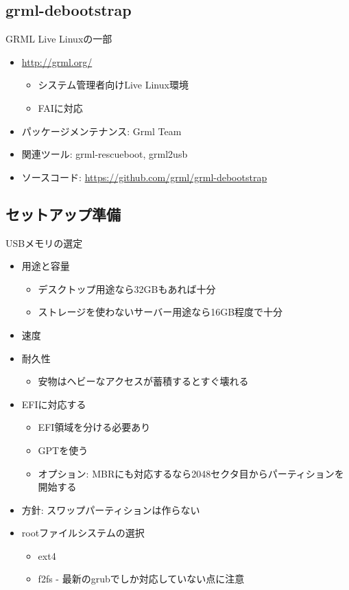 \documentclass[mingoth,a4paper]{jsarticle}
\begin{document}
\subsection{grml-debootstrap}


GRML Live Linuxの一部
\begin{itemize}
  \item \url{http://grml.org/}
    \begin{itemize}
    \item システム管理者向けLive Linux環境
    \item FAIに対応
    \end{itemize}
  \item パッケージメンテナンス: Grml Team
  \item 関連ツール: grml-rescueboot, grml2usb
  \item ソースコード: \url{https://github.com/grml/grml-debootstrap}
\end{itemize}



\subsection{セットアップ準備}

USBメモリの選定
  \begin{itemize}
  \item 用途と容量
    \begin{itemize}
    \item デスクトップ用途なら32GBもあれば十分
    \item ストレージを使わないサーバー用途なら16GB程度で十分
    \end{itemize}
  \item 速度
  \item 耐久性
    \begin{itemize}
    \item 安物はヘビーなアクセスが蓄積するとすぐ壊れる
    \end{itemize}
  \end{itemize}

  \begin{itemize}
  \item EFIに対応する
    \begin{itemize}
    \item EFI領域を分ける必要あり
    \item GPTを使う
    \item オプション: MBRにも対応するなら2048セクタ目からパーティションを開始する
    \end{itemize}
  \item 方針: スワップパーティションは作らない
  \item rootファイルシステムの選択
    \begin{itemize}
    \item ext4
    \item f2fs - 最新のgrubでしか対応していない点に注意
    \end{itemize}
  \end{itemize}
\end{document}
